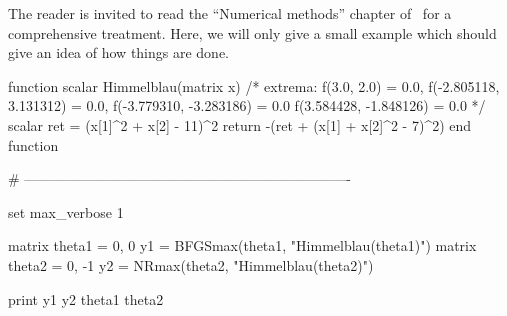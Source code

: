 The reader is invited to read the ``Numerical methods'' chapter of
\GUG\ for a comprehensive treatment. Here, we will only give a small
example which should give an idea of how things are done.

\begin{code}
function scalar Himmelblau(matrix x)
    /* extrema:
    f(3.0, 2.0) = 0.0, 
    f(-2.805118, 3.131312) = 0.0,
    f(-3.779310, -3.283186) = 0.0
    f(3.584428, -1.848126) = 0.0
    */
    scalar ret = (x[1]^2 + x[2] - 11)^2
    return -(ret + (x[1] + x[2]^2 - 7)^2)
end function

# ----------------------------------------------------------------------

set max_verbose 1

matrix theta1 = { 0, 0 }
y1 = BFGSmax(theta1, "Himmelblau(theta1)")
matrix theta2 = { 0, -1 }
y2 = NRmax(theta2, "Himmelblau(theta2)")

print y1 y2 theta1 theta2
\end{code}

